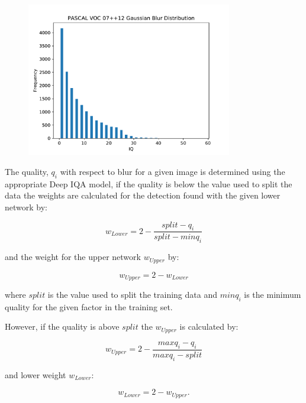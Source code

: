 \begin{figure}[H]
  \centering
    \includegraphics[width=0.8\textwidth]{Figs/Implementation/GaussianBlurdist.pdf}
      \caption{}
    \label{fig:blur_dist}
\end{figure}

The quality, $q_i$ with respect to blur for a given image is determined using the appropriate Deep IQA model, if the quality is below the value used to split the data the weights are calculated for the detection found with the given lower network by:

\begin{equation}
	w_{Lower} = 2 - \frac{split - q_i}{split - minq_i}
\end{equation}

and the weight for the upper network $w_{Upper}$ by:

\begin{equation}
	w_{Upper} = 2 - w_{Lower}
\end{equation}

where $split$ is the value used to split the training data and $minq_i$ is the minimum quality for the given factor in the training set.

However, if the quality is above $split$ the $w_{Upper}$ is calculated by:

\begin{equation}
	w_{Upper} = 2 - \frac{maxq_i - q_i}{maxq_i - split}
\end{equation}

and lower weight $w_{Lower}$:

\begin{equation}
	w_{Lower} = 2 - w_{Upper}.
\end{equation}


